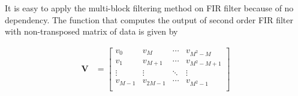 It is easy to apply the multi-block filtering method on FIR filter 
because of no dependency. The function that computes the output of second order FIR filter 
with non-transposed matrix of data is given by

\begin{equation}
    \label{eq:FIR_block_filtering_wo_trans}
    \begin{aligned}
        \bm{V} &= \left[\begin{array}{c|c|c|c}
            v_0 & v_M & \cdots & v_{M^2-M} \\ 
            v_1 & v_{M+1} & \cdots & v_{M^2-M+1} \\
            \vdots & \vdots & \ddots & \vdots \\
            v_{M-1} & v_{2M-1} &\cdots & v_{M^2-1} \\
            \end{array}\right] \\

\end{aligned}
\end{equation}
